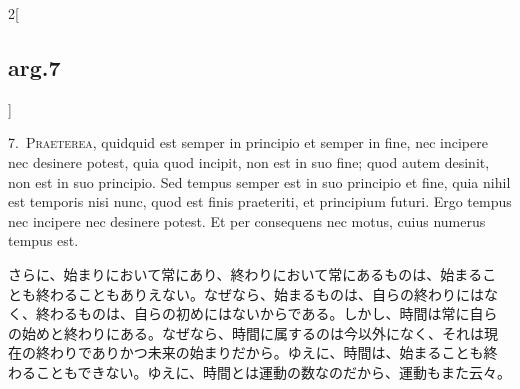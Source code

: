 \documentclass[paper=a4paper,fontsize=10pt,jafontsize=9pt,titlepage]{jlreq}
\begin{document}
\begin{paracol}{2}[\subsection{arg.7}]

7.~{\scshape Praeterea}, quidquid est semper in principio et semper in fine, nec
 incipere nec desinere potest, quia quod incipit, non est in suo fine;
 quod autem desinit, non est in suo principio. Sed tempus semper est in
 suo principio et fine, quia nihil est temporis nisi nunc, quod est
 finis praeteriti, et principium futuri. Ergo tempus nec incipere nec
 desinere potest. Et per consequens nec motus, cuius numerus tempus est.


\switchcolumn


さらに、始まりにおいて常にあり、終わりにおいて常にあるものは、始まるこ
とも終わることもありえない。なぜなら、始まるものは、自らの終わりにはな
く、終わるものは、自らの初めにはないからである。しかし、時間は常に自ら
の始めと終わりにある。なぜなら、時間に属するのは今以外になく、それは現
在の終わりでありかつ未来の始まりだから。ゆえに、時間は、始まることも終
わることもできない。ゆえに、時間とは運動の数なのだから、運動もまた云々。


\switchcolumn*



\end{paracol}
%
%
%
%
\end{document}
